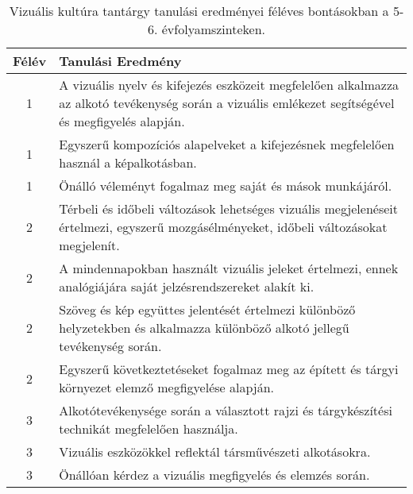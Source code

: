        
           \begin{longtable}{c | p{12cm} }
            \caption[Vizuális kultúra 5-6.]{Vizuális kultúra tantárgy tanulási eredményei féléves bontásokban a 5-6. évfolyamszinteken. }  \\

            \textbf{Félév} & \textbf{Tanulási Eredmény} \\
            \hline
            \endhead
                                
                                          1 &  A vizuális nyelv és kifejezés eszközeit megfelelően alkalmazza az alkotó tevékenység során a vizuális emlékezet segítségével és megfigyelés alapján. \\ \hline
                                          1 &  Egyszerű kompozíciós alapelveket a kifejezésnek megfelelően használ a képalkotásban. \\ \hline
                                          1 &  Önálló véleményt fogalmaz meg saját és mások munkájáról. \\ \hline
                                      
                                
                                          2 &  Térbeli és időbeli változások lehetséges vizuális megjelenéseit értelmezi, egyszerű mozgásélményeket, időbeli változásokat megjelenít. \\ \hline
                                          2 &  A mindennapokban használt vizuális jeleket értelmezi, ennek analógiájára saját jelzésrendszereket alakít ki. \\ \hline
                                          2 &  Szöveg és kép együttes jelentését értelmezi különböző helyzetekben és alkalmazza különböző alkotó jellegű tevékenység során. \\ \hline
                                          2 &  Egyszerű következtetéseket fogalmaz meg az épített és tárgyi környezet elemző megfigyelése alapján. \\ \hline
                                      
                                
                                          3 &  Alkotótevékenysége során a választott rajzi és tárgykészítési technikát megfelelően használja. \\ \hline
                                          3 &  Vizuális eszközökkel reflektál társművészeti alkotásokra. \\ \hline
                                          3 &  Önállóan kérdez a vizuális megfigyelés és elemzés során. \\ \hline
                                      

\end{longtable}
